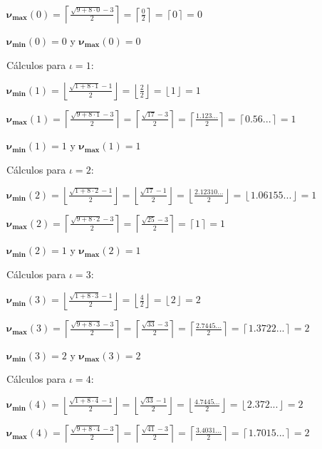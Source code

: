 \documentclass{amsart}
\theoremstyle{definition}
\theoremstyle{remark}
\numberwithin{equation}{section}
\newcommand{\monrel}[1]{\mathbf{#1}}
\newcommand{\funct}[1]{\monrel{#1}}
\newcommand{\functat}[2]{\funct{#1}{\left({#2}\right)}}
\begin{document}
$\functat{{\nu}_{\max}}{0} =
\left\lceil\frac{\sqrt{9+8\cdot 0}-3}{2}\right\rceil =
\left\lceil\frac{0}{2}\right\rceil =
\left\lceil{0}\right\rceil = 0
$


$\functat{{\nu}_{\min}}{0} = 0$ y $\functat{{\nu}_{\max}}{0} = 0$


Cálculos para $\iota = 1$:


$\functat{{\nu}_{\min}}{1} =
\left\lfloor\frac{\sqrt{1+8\cdot 1}-1}{2}\right\rfloor =
\left\lfloor\frac{2}{2}\right\rfloor =
\left\lfloor{1}\right\rfloor = 1
$


$\functat{{\nu}_{\max}}{1} =
\left\lceil\frac{\sqrt{9+8\cdot 1}-3}{2}\right\rceil =
\left\lceil\frac{\sqrt{17}-3}{2}\right\rceil =
\left\lceil\frac{1.123...}{2}\right\rceil =
\left\lceil{0.56...}\right\rceil = 1
$


$\functat{{\nu}_{\min}}{1} = 1$ y $\functat{{\nu}_{\max}}{1} = 1$


Cálculos para $\iota = 2$:


$\functat{{\nu}_{\min}}{2} =
\left\lfloor\frac{\sqrt{1+8\cdot 2}-1}{2}\right\rfloor =
\left\lfloor\frac{\sqrt{17}-1}{2}\right\rfloor =
\left\lfloor\frac{2.12310...}{2}\right\rfloor =
\left\lfloor{1.06155...}\right\rfloor = 1
$


$\functat{{\nu}_{\max}}{2} =
\left\lceil\frac{\sqrt{9+8\cdot 2}-3}{2}\right\rceil =
\left\lceil\frac{\sqrt{25}-3}{2}\right\rceil =
\left\lceil{1}\right\rceil = 1
$


$\functat{{\nu}_{\min}}{2} = 1$ y $\functat{{\nu}_{\max}}{2} = 1$


Cálculos para $\iota = 3$:


$\functat{{\nu}_{\min}}{3} =
\left\lfloor\frac{\sqrt{1+8\cdot 3}-1}{2}\right\rfloor =
\left\lfloor\frac{4}{2}\right\rfloor =
\left\lfloor{2}\right\rfloor = 2
$


$\functat{{\nu}_{\max}}{3} =
\left\lceil\frac{\sqrt{9+8\cdot 3}-3}{2}\right\rceil =
\left\lceil\frac{\sqrt{33}-3}{2}\right\rceil =
\left\lceil\frac{2.7445...}{2}\right\rceil =
\left\lceil{1.3722...}\right\rceil = 2
$


$\functat{{\nu}_{\min}}{3} = 2$ y $\functat{{\nu}_{\max}}{3} = 2$


Cálculos para $\iota = 4$:


$\functat{{\nu}_{\min}}{4} =
\left\lfloor\frac{\sqrt{1+8\cdot 4}-1}{2}\right\rfloor =
\left\lfloor\frac{\sqrt{33}-1}{2}\right\rfloor =
\left\lfloor\frac{4.7445...}{2}\right\rfloor =
\left\lfloor{2.372...}\right\rfloor = 2
$


$\functat{{\nu}_{\max}}{4} =
\left\lceil\frac{\sqrt{9+8\cdot 4}-3}{2}\right\rceil =
\left\lceil\frac{\sqrt{41}-3}{2}\right\rceil =
\left\lceil\frac{3.4031...}{2}\right\rceil =
\left\lceil{1.7015...}\right\rceil = 2
$
\end{document}

